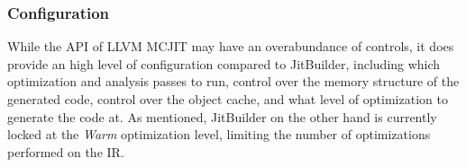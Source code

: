 \subsubsection{Configuration}
While the API of LLVM MCJIT may have an overabundance of controls, it does provide an high level of configuration compared to JitBuilder, including which optimization and analysis passes to run, control over the memory structure of the generated code, control over the object cache, and what level of optimization to generate the code at.
As mentioned, JitBuilder on the other hand is currently locked at the \textit{Warm} optimization level, limiting the number of optimizations performed on the IR.
